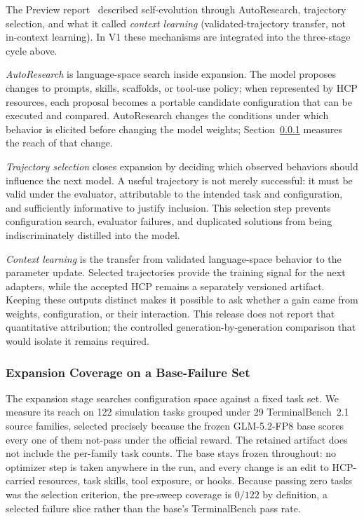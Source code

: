 The Preview report~\citep{macaron_v1_preview2026} described self-evolution through AutoResearch, trajectory selection, and what it called \emph{context learning} (validated-trajectory transfer, not in-context learning). In V1 these mechanisms are integrated into the three-stage cycle above.

\emph{AutoResearch} is language-space search inside expansion. The model proposes changes to prompts, skills, scaffolds, or tool-use policy; when represented by HCP resources, each proposal becomes a portable candidate configuration that can be executed and compared. AutoResearch changes the conditions under which behavior is elicited before changing the model weights; Section~\ref{sec:rsi_coverage} measures the reach of that change.

\emph{Trajectory selection} closes expansion by deciding which observed behaviors should influence the next model. A useful trajectory is not merely successful: it must be valid under the evaluator, attributable to the intended task and configuration, and sufficiently informative to justify inclusion. This selection step prevents configuration search, evaluator failures, and duplicated solutions from being indiscriminately distilled into the model.

\emph{Context learning} is the transfer from validated language-space behavior to the parameter update. Selected trajectories provide the training signal for the next adapters, while the accepted HCP remains a separately versioned artifact. Keeping these outputs distinct makes it possible to ask whether a gain came from weights, configuration, or their interaction. This release does not report that quantitative attribution; the controlled generation-by-generation comparison that would isolate it remains required.

\subsubsection{Expansion Coverage on a Base-Failure Set}
\label{sec:rsi_coverage}

The expansion stage searches configuration space against a fixed task set. We measure its reach on 122 simulation tasks grouped under 29 TerminalBench~2.1~\citep{terminalbench2026} source families, selected precisely because the frozen GLM-5.2-FP8 base scores every one of them not-pass under the official reward. The retained artifact does not include the per-family task counts. The base stays frozen throughout: no optimizer step is taken anywhere in the run, and every change is an edit to HCP-carried resources, task skills, tool exposure, or hooks. Because passing zero tasks was the selection criterion, the pre-sweep coverage is $0/122$ by definition, a selected failure slice rather than the base's TerminalBench pass rate.

